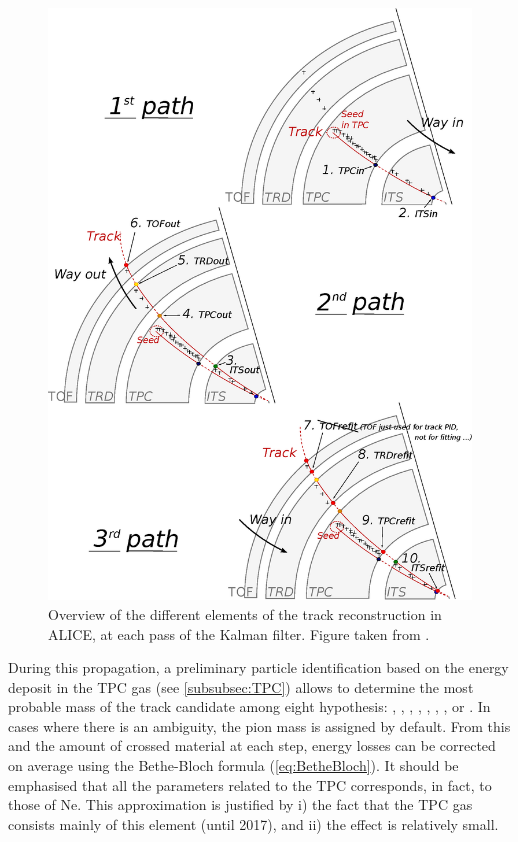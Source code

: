 \begin{figure}[!t]
	\centering
	\includegraphics[width=1.05\textwidth]{Figs/Chapter3/Schema-PcpTrackingALICE.eps}
	\caption{Overview of the different elements of the track reconstruction in ALICE, at each pass of the Kalman filter. Figure taken from \cite{maireTrackReconstructionPrinciple2011}.}
	\label{fig:Kalmanfiltering}
\end{figure}

During this propagation, a preliminary particle identification based on the energy deposit in the TPC gas (see \Sec\ref{subsubsec:TPC}) allows to determine the most probable mass of the track candidate among eight hypothesis: \ePlusMinus, \muPlusMinus, \rmPiPlusMinus, \Kplusmin, \pOrPbar, \rmDeutonPM, \rmTritonPM, \rmHeThreePM or \rmHeFourPM. In cases where there is an ambiguity, the pion mass is assigned by default. From this and the amount of crossed material at each step, energy losses can be corrected on average using the Bethe-Bloch formula (\eq\ref{eq:BetheBloch}). It should be emphasised that all the parameters related to the TPC corresponds, in fact, to those of Ne. This approximation is justified by i) the fact that the TPC gas consists mainly of this element (until 2017), and ii) the effect is relatively small. 

